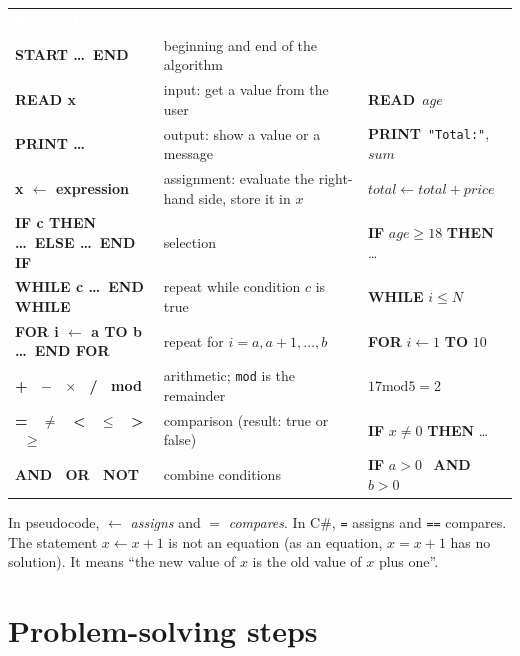\documentclass[11pt,a4paper]{article}
\newcommand{\READ}{\textbf{READ}\ }
\newcommand{\PRINT}{\textbf{PRINT}\ }
\newcommand{\AND}{\ \textbf{AND}\ }
\newcommand{\MOD}{\mathbin{\mathrm{mod}}}
\newcommand{\str}[1]{\texttt{"#1"}}
\newcommand{\hdr}[1]{\textcolor{white}{\sffamily\bfseries #1}}
\newcommand{\hrow}{\rowcolor{ink}}
\begin{document}
\begin{center}\small
\begin{tabularx}{\linewidth}{>{\ttfamily\bfseries}p{47mm}Lp{44mm}}
\hrow \hdr{Keyword} & \hdr{Meaning} & \hdr{Example}\\
START \dots\ END & beginning and end of the algorithm & \\
 READ x & input: get a value from the user & \READ $age$\\
PRINT \dots & output: show a value or a message & \PRINT \str{Total:}, $sum$\\
 x $\gets$ expression & assignment: evaluate the right-hand side, store it in $x$ & $total \gets total + price$\\
IF c THEN \dots\ ELSE \dots\ END IF & selection & \textbf{IF} $age\ge 18$ \textbf{THEN} \dots\\
 WHILE c \dots\ END WHILE & repeat while condition $c$ is true & \textbf{WHILE} $i \le N$\\
FOR i $\gets$ a TO b \dots\ END FOR & repeat for $i=a,a+1,\dots,b$ & \textbf{FOR} $i\gets 1$ \textbf{TO} $10$\\
 + \ $-$ \ $\times$ \ / \ mod & arithmetic; \texttt{mod} is the remainder & $17 \MOD 5 = 2$\\
= \ $\neq$ \ < \ $\le$ \ > \ $\ge$ & comparison (result: true or false) & \textbf{IF} $x\ne 0$ \textbf{THEN} \dots\\
 AND \ OR \ NOT & combine conditions & \textbf{IF} $a>0$ \AND $b>0$\\
\end{tabularx}
\end{center}

\begin{warnbox}
In pseudocode, $\gets$ \emph{assigns} and $=$ \emph{compares}. In C\#, \texttt{=} assigns and \texttt{==} compares. The statement $x \gets x+1$ is not an equation (as an equation, $x=x+1$ has no solution). It means ``the new value of $x$ is the old value of $x$ plus one''.
\end{warnbox}

\section{Problem-solving steps}\label{sec:problem}
\end{document}
